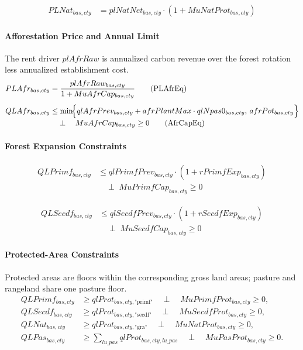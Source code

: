 \begin{align}
  PLNat_{bas,cty}
  &=
  plNatNet_{bas,cty}
  \cdot (1+MuNatProt_{bas,cty})
  \tag{PLNatEq}\label{eq:PLNatEq}
\end{align}

\paragraph{Afforestation Price and Annual Limit}
The rent driver \(plAfrRaw\) is annualized carbon revenue over the forest rotation less annualized establishment cost.
\begin{align}
  PLAfr_{bas,cty}
  &= \frac{plAfrRaw_{bas,cty}}
           {1+MuAfrCap_{bas,cty}}
  \tag{PLAfrEq}\label{eq:PLAfrEq}\\[0.4em]
  QLAfr_{bas,cty}
  &\le \min\!\Bigl\{qlAfrPrev_{bas,cty}
     + afrPlantMax\cdot qlNpas0_{bas,cty},\,
     afrPot_{bas,cty}\Bigr\}
  \nonumber\\[-0.3em]
  &\quad\perp\quad MuAfrCap_{bas,cty}\ge 0
  \tag{AfrCapEq}\label{eq:AfrCapEq}
\end{align}

\paragraph{Forest Expansion Constraints}
\begin{align}
  QLPrimf_{bas,cty}
  &\le
  qlPrimfPrev_{bas,cty}
  \cdot
  (1+rPrimfExp_{bas,cty})
  \nonumber\\[-0.3em]
  &\quad \perp\;
  MuPrimfCap_{bas,cty}\ge 0
  \tag{PrimfCapEq}\label{eq:PrimfCapEq}
\end{align}

\begin{align}
  QLSecdf_{bas,cty}
  &\le
  qlSecdfPrev_{bas,cty}
  \cdot
  (1+rSecdfExp_{bas,cty})
  \nonumber\\[-0.3em]
  &\quad \perp\;
  MuSecdfCap_{bas,cty}\ge 0
  \tag{SecdfCapEq}\label{eq:SecdfCapEq}
\end{align}

\paragraph{Protected-Area Constraints}
Protected areas are floors within the corresponding gross land areas; pasture and rangeland share one pasture floor.
\begin{align}
  QLPrimf_{bas,cty} &\ge qlProt_{bas,cty,\text{"primf"}}
  \quad\perp\quad MuPrimfProt_{bas,cty}\ge0,
  \tag{PrimfProtEq}\label{eq:PrimfProtEq}\\
  QLSecdf_{bas,cty} &\ge qlProt_{bas,cty,\text{"secdf"}}
  \quad\perp\quad MuSecdfProt_{bas,cty}\ge0,
  \tag{SecdfProtEq}\label{eq:SecdfProtEq}\\
  QLNat_{bas,cty} &\ge qlProt_{bas,cty,\text{"gra"}}
  \quad\perp\quad MuNatProt_{bas,cty}\ge0,
  \tag{NatProtEq}\label{eq:NatProtEq}\\
  QLPas_{bas,cty} &\ge \sum_{lu\_pas}qlProt_{bas,cty,lu\_pas}
  \quad\perp\quad MuPasProt_{bas,cty}\ge0.
  \tag{PasProtEq}\label{eq:PasProtEq}
\end{align}

